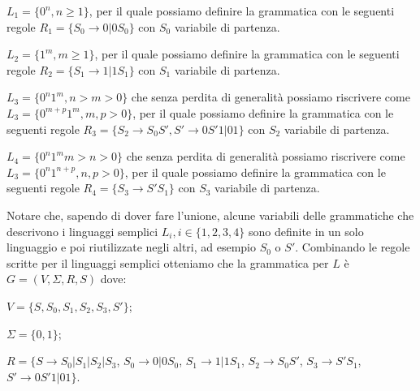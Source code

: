 \begin{description}
	\item $L_1 = \{0^n, n \geq 1\}$, per il quale possiamo definire la grammatica con le seguenti regole $R_1 = \{S_0 \to 0|0S_0\}$ con $S_0$ variabile di partenza.
	\item $L_2 = \{1^m, m \geq 1\}$, per il quale possiamo definire la grammatica con le seguenti regole $R_2 = \{S_1 \to 1|1S_1\}$ con $S_1$ variabile di partenza.
	\item $L_3 = \{0^n1^m,  n > m > 0\}$ che senza perdita di generalit\`a possiamo riscrivere come $L_3 = \{0^{m+p}1^m, m, p > 0\}$, per il quale possiamo definire la grammatica con le seguenti regole $R_3 = \{S_2 \to S_0S', S' \to 0S'1 | 01\}$ con $S_2$ variabile di partenza.
	\item $L_4 = \{0^n1^m  m > n > 0\}$ che senza perdita di generalit\`a possiamo riscrivere come $L_3 = \{0^n1^{n+p}, n, p > 0\}$, per il quale possiamo definire la grammatica con le seguenti regole $R_4 = \{S_3 \to S'S_1\}$ con $S_3$ variabile di partenza.
\end{description}
Notare che, sapendo di dover fare l'unione, alcune variabili delle grammatiche che descrivono i linguaggi semplici $L_i, i \in \{1,2,3,4\}$ sono definite in un solo linguaggio e poi riutilizzate negli altri, ad esempio $S_0$ o $S'$. \newline
Combinando le regole scritte per il linguaggi semplici otteniamo che la grammatica per $L$ \`e $G = (V, \Sigma, R, S)$ dove: 
\begin{description}
	\item $V = \{S, S_0, S_1, S_2, S_3, S'\}$;
	\item $\Sigma = \{0, 1\}$;
	\item $R = \{ S \to S_0 | S_1 | S_2 | S_3$, $S_0 \to 0|0S_0$, $S_1 \to 1|1S_1$, $S_2 \to S_0S'$, $S_3 \to S'S_1$, $S' \to 0S'1 | 01\}$.
\end{description}
